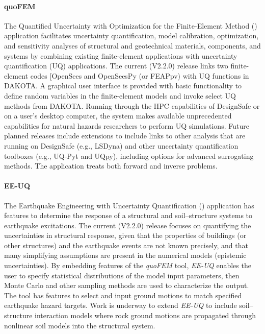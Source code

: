 \paragraph{quoFEM}  The Quantified Uncertainty with Optimization for the Finite-Element Method () application facilitates uncertainty quantification, model calibration, optimization, and sensitivity analyses of structural and geotechnical materials, components, and systems by combining existing finite-element applications with uncertainty quantification (UQ) applications. The current (V2.2.0) release links two finite-element codes [OpenSees and OpenSeesPy (or FEAPpv) with UQ functions in DAKOTA. A graphical user interface is provided with basic functionality to define random variables in the finite-element models and invoke select UQ methods from DAKOTA. Running through the HPC capabilities of DesignSafe or on a user’s desktop computer, the system makes available unprecedented capabilities for natural hazards researchers to perform UQ simulations. Future planned releases include extensions to include links to other analysis that are running on DesignSafe (e.g., LSDyna) and other uncertainty quantification toolboxes (e.g., UQ-Pyt and UQpy), including options for advanced surrogating methods. The application treats both forward and inverse problems.

\paragraph{EE-UQ} The Earthquake Engineering with Uncertainty Quantification () application has features to determine the response of a structural and soil--structure systems to earthquake excitations. The current (V2.2.0) release focuses on quantifying the uncertainties in structural response, given that the properties of buildings (or other structures) and the earthquake events are not known precisely, and that many simplifying assumptions are present in the numerical models (epistemic uncertainties).  By embedding features of the \emph{quoFEM} tool, \emph{EE-UQ} enables the user to specify statistical distributions of the model input parameters, then Monte Carlo and other sampling methods are used to characterize the output. The tool has features to select and input ground motions to match specified earthquake hazard targets. Work is underway to extend \emph{EE-UQ} to include soil--structure interaction models where rock ground motions are propagated through nonlinear soil models into the structural system.

